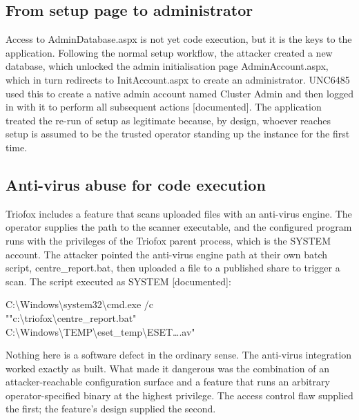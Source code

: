 \documentclass[11pt,a4paper]{article}
\newcommand{\code}[1]{{\small\ttfamily #1}}
\newenvironment{codeblock}
  {\par\needspace{3\baselineskip}\vspace{3pt}\begin{lrbox}{\cbbox}\begin{minipage}{\dimexpr\linewidth-1.6em}\footnotesize\ttfamily\raggedright\vspace{3pt}}
  {\vspace{3pt}\end{minipage}\end{lrbox}\noindent\hspace*{0.4em}\colorbox{codebg}{\usebox{\cbbox}}\par\vspace{3pt}}
\newcommand{\tier}[1]{{\small\color{meta}\textsf{[#1]}}}
\begin{document}
\subsection{From setup page to administrator}

Access to \code{AdminDatabase.aspx} is not yet code execution, but it is the keys to the application. Following the normal setup workflow, the attacker created a new database, which unlocked the admin initialisation page \code{AdminAccount.aspx}, which in turn redirects to \code{InitAccount.aspx} to create an administrator. UNC6485 used this to create a native admin account named \code{Cluster Admin} and then logged in with it to perform all subsequent actions \tier{documented}. The application treated the re-run of setup as legitimate because, by design, whoever reaches setup is assumed to be the trusted operator standing up the instance for the first time.

\subsection{Anti-virus abuse for code execution}

Triofox includes a feature that scans uploaded files with an anti-virus engine. The operator supplies the path to the scanner executable, and the configured program runs with the privileges of the Triofox parent process, which is the \code{SYSTEM} account. The attacker pointed the anti-virus engine path at their own batch script, \code{centre\_report.bat}, then uploaded a file to a published share to trigger a scan. The script executed as \code{SYSTEM} \tier{documented}:

\begin{codeblock}
C:\textbackslash Windows\textbackslash system32\textbackslash cmd.exe /c\\
""c:\textbackslash triofox\textbackslash centre\_report.bat"\\
\hspace*{1em}C:\textbackslash Windows\textbackslash TEMP\textbackslash eset\_temp\textbackslash ESET\ldots.av"
\end{codeblock}

Nothing here is a software defect in the ordinary sense. The anti-virus integration worked exactly as built. What made it dangerous was the combination of an attacker-reachable configuration surface and a feature that runs an arbitrary operator-specified binary at the highest privilege. The access control flaw supplied the first; the feature's design supplied the second.
\end{document}
